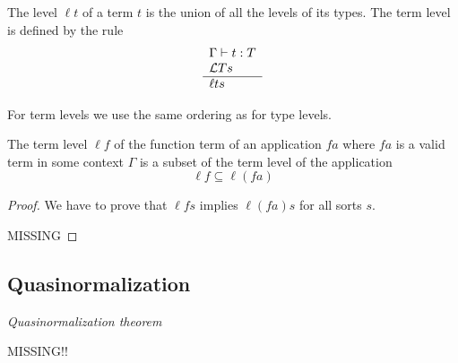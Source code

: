 \begin{definition}
    The level $\ell t$ of a term $t$ is the union of all the levels of its
    types. The term level is defined by the rule
    $$
    \begin{array}{l} 
        \Gamma \vdash t: T
        \\
        {\cal L} T s
     \\ \hline 
        \ell t s
    \end{array}
    $$
\end{definition}

For term levels we use the same ordering as for type levels.


\begin{theorem}
    The term level $\ell f$ of the function term of an application $f a$ where
    $f a$ is a valid term in some context $\Gamma$ is a subset of the term level
    of the application
    $$
    \ell f \subseteq \ell (f a)
    $$

    \begin{proof}

        We have to prove that $\ell f s$ implies $\ell (f a) s$ for all sorts $s$.

        MISSING
    \end{proof}
\end{theorem}


\subsection{Quasinormalization}


\begin{theorem}
    \label{quasinormalization}
    \emph{Quasinormalization theorem}

    MISSING!!
\end{theorem}
